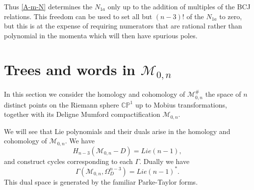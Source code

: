 \documentclass[11pt]{article}
\newcommand{\CP}{\mathbb{CP}}
\newcommand{\cM}{\mathcal{M}}
\newcommand{\1}{{\rm 1\hskip-0.25em I}}
\begin{document}
Thus  \eqref{A-m-N} determines the $N_{1a}$ only up to the addition of multiples of the BCJ relations.  This freedom can be used to set all but $(n-3)!$ of the $N_{1a}$ to zero, but this is at the expense of requiring numerators that are rational rather than polynomial in the momenta which will then have spurious poles.  



\section{Trees and words in $\cM_{0,n}$}
In this section we consider the homology and cohomology of $\cM_{0,n}^\#$ the space of $n$ distinct points on the Riemann sphere $\CP^1$ up to Mobius transformations, together with its Deligne Mumford compactification $\cM_{0,n}$. \begin{center}
\end{center}


We will see that Lie polynomials and their duals arise in the homology and cohomology of $\cM_{0,n}$.   We have
\begin{equation}
H_{n-3}(\cM_{0,n}-D)=Lie(n-1), 
\end{equation}
and construct cycles corresponding to each $\Gamma$.  Dually we have
\begin{equation}
\Gamma(\cM_{0,n},\Omega^{n-3}_D)=Lie(n-1)^*.
\end{equation}
This dual space is generated by the familiar Parke-Taylor forms. 
\end{document}
